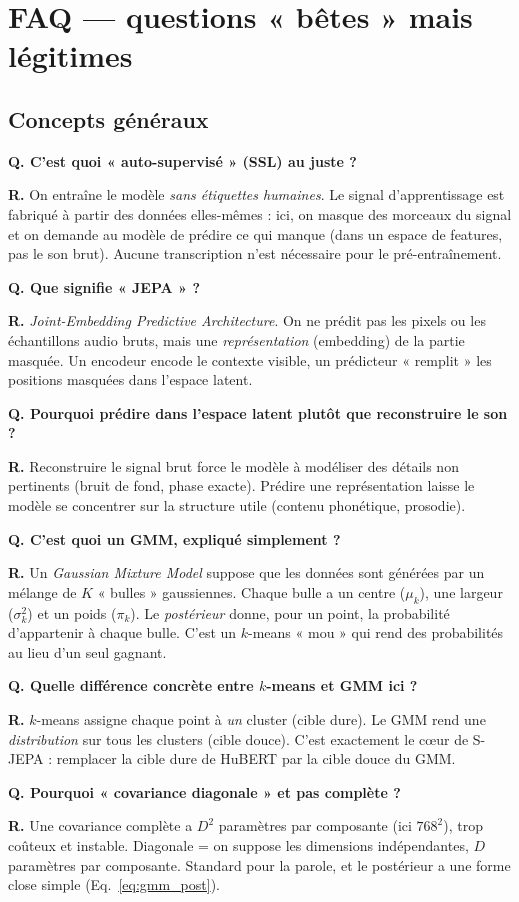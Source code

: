 \documentclass[11pt,a4paper]{article}
\newcommand{\faq}[2]{%
  \par\medskip
  \begin{faqbox}
  \textbf{Q. #1}\par\smallskip
  \textbf{R.} #2
  \end{faqbox}
}
\begin{document}
\section{FAQ --- questions « bêtes » mais légitimes}

\subsection{Concepts généraux}

\faq{C'est quoi « auto-supervisé » (SSL) au juste ?}{%
On entraîne le modèle \emph{sans étiquettes humaines}. Le signal
d'apprentissage est fabriqué à partir des données elles-mêmes : ici, on
masque des morceaux du signal et on demande au modèle de prédire ce qui
manque (dans un espace de features, pas le son brut). Aucune transcription
n'est nécessaire pour le pré-entraînement.}

\faq{Que signifie « JEPA » ?}{%
\emph{Joint-Embedding Predictive Architecture}. On ne prédit pas les pixels
ou les échantillons audio bruts, mais une \emph{représentation} (embedding)
de la partie masquée. Un encodeur encode le contexte visible, un prédicteur
« remplit » les positions masquées dans l'espace latent.}

\faq{Pourquoi prédire dans l'espace latent plutôt que reconstruire le son ?}{%
Reconstruire le signal brut force le modèle à modéliser des détails non
pertinents (bruit de fond, phase exacte). Prédire une représentation laisse
le modèle se concentrer sur la structure utile (contenu phonétique,
prosodie).}

\faq{C'est quoi un GMM, expliqué simplement ?}{%
Un \emph{Gaussian Mixture Model} suppose que les données sont générées par
un mélange de $K$ « bulles » gaussiennes. Chaque bulle a un centre
($\mu_k$), une largeur ($\sigma_k^2$) et un poids ($\pi_k$). Le
\emph{postérieur} donne, pour un point, la probabilité d'appartenir à
chaque bulle. C'est un $k$-means « mou » qui rend des probabilités au lieu
d'un seul gagnant.}

\faq{Quelle différence concrète entre $k$-means et GMM ici ?}{%
$k$-means assigne chaque point à \emph{un} cluster (cible dure). Le GMM
rend une \emph{distribution} sur tous les clusters (cible douce). C'est
exactement le cœur de S-JEPA : remplacer la cible dure de HuBERT par la
cible douce du GMM.}

\faq{Pourquoi « covariance diagonale » et pas complète ?}{%
Une covariance complète a $D^2$ paramètres par composante (ici $768^2$),
trop coûteux et instable. Diagonale = on suppose les dimensions
indépendantes, $D$ paramètres par composante. Standard pour la parole, et
le postérieur a une forme close simple (Eq.~\ref{eq:gmm_post}).}
\end{document}
